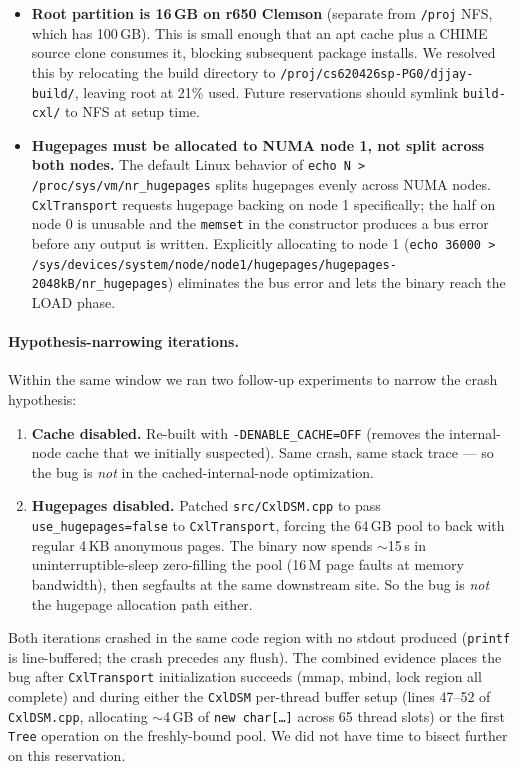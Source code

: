 \documentclass[11pt,a4paper]{article}
\begin{document}
\begin{itemize}[nosep]
    \item \textbf{Root partition is 16\,GB on r650 Clemson} (separate from \texttt{/proj} NFS, which has 100\,GB). This is small enough that an apt cache plus a CHIME source clone consumes it, blocking subsequent package installs. We resolved this by relocating the build directory to \texttt{/proj/cs620426sp-PG0/djjay-build/}, leaving root at 21\% used. Future reservations should symlink \texttt{build-cxl/} to NFS at setup time.
    \item \textbf{Hugepages must be allocated to NUMA node 1, not split across both nodes.} The default Linux behavior of \texttt{echo N > /proc/sys/vm/nr\_hugepages} splits hugepages evenly across NUMA nodes. \texttt{CxlTransport} requests hugepage backing on node 1 specifically; the half on node 0 is unusable and the \texttt{memset} in the constructor produces a bus error before any output is written. Explicitly allocating to node 1 (\texttt{echo 36000 > /sys/devices/system/node/node1/hugepages/hugepages-2048kB/nr\_hugepages}) eliminates the bus error and lets the binary reach the LOAD phase.
\end{itemize}

\paragraph{Hypothesis-narrowing iterations.} Within the same window we ran two follow-up experiments to narrow the crash hypothesis:

\begin{enumerate}[nosep]
    \item \textbf{Cache disabled.} Re-built with \texttt{-DENABLE\_CACHE=OFF} (removes the internal-node cache that we initially suspected). Same crash, same stack trace --- so the bug is \emph{not} in the cached-internal-node optimization.
    \item \textbf{Hugepages disabled.} Patched \texttt{src/CxlDSM.cpp} to pass \texttt{use\_hugepages=false} to \texttt{CxlTransport}, forcing the 64\,GB pool to back with regular 4\,KB anonymous pages. The binary now spends $\sim$15\,s in uninterruptible-sleep zero-filling the pool (16\,M page faults at memory bandwidth), then segfaults at the same downstream site. So the bug is \emph{not} the hugepage allocation path either.
\end{enumerate}

Both iterations crashed in the same code region with no stdout produced (\texttt{printf} is line-buffered; the crash precedes any flush). The combined evidence places the bug after \texttt{CxlTransport} initialization succeeds (mmap, mbind, lock region all complete) and during either the \texttt{CxlDSM} per-thread buffer setup (lines 47--52 of \texttt{CxlDSM.cpp}, allocating $\sim$4\,GB of \texttt{new char[\ldots]} across 65 thread slots) or the first \texttt{Tree} operation on the freshly-bound pool. We did not have time to bisect further on this reservation.
\end{document}

